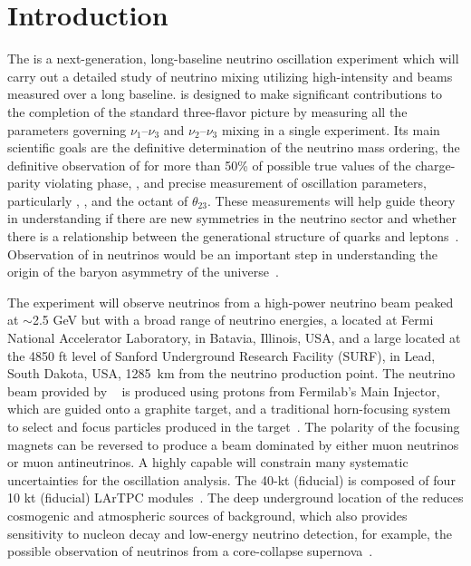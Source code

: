 \section{Introduction}
\label{sec:intro}

The  is a next-generation, long-baseline neutrino oscillation experiment which will carry out a detailed study of neutrino mixing utilizing high-intensity \numu and \anumu beams measured over a long baseline.
 is designed to make significant contributions to the completion of the standard three-flavor picture by measuring all the parameters governing $\nu_1$--$\nu_3$ and $\nu_2$--$\nu_3$ mixing in a single experiment. Its main scientific goals are the definitive determination of the neutrino mass ordering, the definitive observation of  for more than 50\% of possible true values of the charge-parity violating phase, \deltacp,  
and precise measurement of oscillation parameters, particularly \deltacp, , and the octant of $\theta_{23}$.
These measurements will help guide theory in understanding if there are new symmetries in the neutrino sector and whether there is a relationship between the generational structure of quarks and leptons~\cite{Qian:2015waa}. Observation of  in neutrinos would be an important step in understanding the origin of the baryon asymmetry of the universe~\cite{Fukugita:1986hr, Davidson:2008bu}.

The  experiment will observe neutrinos from a high-power neutrino beam peaked at $\sim$2.5 GeV but with a broad range of neutrino energies, a  located at Fermi National Accelerator Laboratory, in Batavia, Illinois, USA, and a large   located at the 4850 ft level of Sanford Underground Research Facility (SURF), in Lead, South Dakota, USA, 1285~km from the neutrino production point. The neutrino beam provided by ~\cite{Abi:2020wmh} is produced using protons from Fermilab's Main Injector, which are guided onto a graphite target, and a traditional horn-focusing system to select and focus particles produced in the target~\cite{Abi:2020evt}. The polarity of the focusing magnets can be reversed to produce a beam dominated by either muon neutrinos or muon antineutrinos. A highly capable  will constrain many systematic uncertainties for the oscillation analysis. The 40-kt (fiducial)  is composed of four 10 kt (fiducial) LArTPC modules~\cite{Acciarri:2016crz,Acciarri:2015uup,Acciarri:2016ooe}.
The deep underground location of the  reduces cosmogenic and atmospheric sources of background, which also provides sensitivity to nucleon decay and low-energy neutrino detection, for example, the possible observation of neutrinos from a core-collapse supernova~\cite{Abi:2020evt}.

